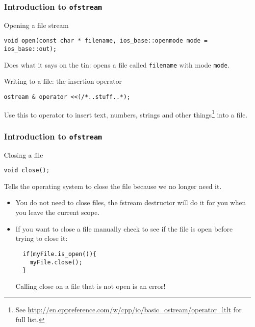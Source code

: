 \documentclass{beamer}
\begin{document}
\begin{frame}[fragile]
  \frametitle{Introduction to \texttt{ofstream}}
  \begin{block}{Opening a file stream}
  	\begin{lstlisting}[aboveskip=0pt]
  void open(const char * filename, ios_base::openmode mode = ios_base::out);
  	\end{lstlisting}
		Does what it says on the tin: opens a file called \texttt{filename} with mode \texttt{mode}.
  
  \end{block}
  \pause
  \begin{block}{Writing to a file: the insertion operator}
  \begin{lstlisting}[aboveskip=0pt]
  ostream & operator <<(/*..stuff..*);
  \end{lstlisting}
  Use this to operator to insert text, numbers, strings and other things\footnote{See \url{http://en.cppreference.com/w/cpp/io/basic_ostream/operator_ltlt} for full list.} into a file.
  \end{block}
  
\end{frame}

\begin{frame}[fragile]
  \frametitle{Introduction to \texttt{ofstream}}
  
  \begin{block}{Closing a file}
  \begin{lstlisting}[aboveskip=0pt]
  void close();
  \end{lstlisting}
  Tells the operating system to close the file because we no longer need it.
  \end{block}
  \pause
  \begin{warnblocke}
    \begin{itemize}
      \item{You do not need to close files, the fstream destructor will do it for you when you leave the current scope.}
      \pause
      \item{If you want to close a file manually check to see if the file is open before trying to close it:
      \begin{lstlisting}
  if(myFile.is_open()){
    myFile.close();
  }
      \end{lstlisting}
      Calling close on a file that is not open is an error!}
    \end{itemize}
  \end{warnblocke}
  
\end{frame}
\end{document}
